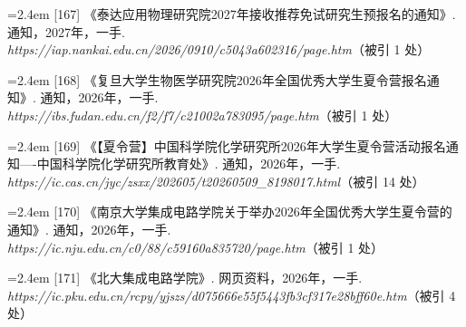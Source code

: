 {\nopagebreak\vspace{1pt}
\noindent\hangindent=2.4em \label{src:S0209}{\color{cAccent}[167]} 《泰达应用物理研究院2027年接收推荐免试研究生预报名的通知》. 通知，2027年，一手. \textit{https://iap.nankai.edu.cn/2026/0910/c5043a602316/page.htm}（被引 1 处）\par
\vspace{0.6pt}
\vspace{3.5pt}\par
\nopagebreak\vspace{1pt}
\noindent\hangindent=2.4em \label{src:S0210}{\color{cAccent}[168]} 《复旦大学生物医学研究院2026年全国优秀大学生夏令营报名通知》. 通知，2026年，一手. \textit{https://ibs.fudan.edu.cn/f2/f7/c21002a783095/page.htm}（被引 1 处）\par
\vspace{0.6pt}
\vspace{3.5pt}\par
\nopagebreak\vspace{1pt}
\noindent\hangindent=2.4em \label{src:S0211}{\color{cAccent}[169]} 《【夏令营】中国科学院化学研究所2026年大学生夏令营活动报名通知----中国科学院化学研究所教育处》. 通知，2026年，一手. \textit{https://ic.cas.cn/jyc/zsxx/202605/t20260509\_8198017.html}（被引 14 处）\par
\vspace{0.6pt}
\vspace{3.5pt}\par
\nopagebreak\vspace{1pt}
\noindent\hangindent=2.4em \label{src:S0212}{\color{cAccent}[170]} 《南京大学集成电路学院关于举办2026年全国优秀大学生夏令营的通知》. 通知，2026年，一手. \textit{https://ic.nju.edu.cn/c0/88/c59160a835720/page.htm}（被引 1 处）\par
\vspace{0.6pt}
\vspace{3.5pt}\par
\nopagebreak\vspace{1pt}
\noindent\hangindent=2.4em \label{src:S0213}{\color{cAccent}[171]} 《北大集成电路学院》. 网页资料，2026年，一手. \textit{https://ic.pku.edu.cn/rcpy/yjszs/d075666e55f5443fb3cf317e28bff60e.htm}（被引 4 处）\par
\vspace{0.6pt}
\vspace{3.5pt}\par
}
